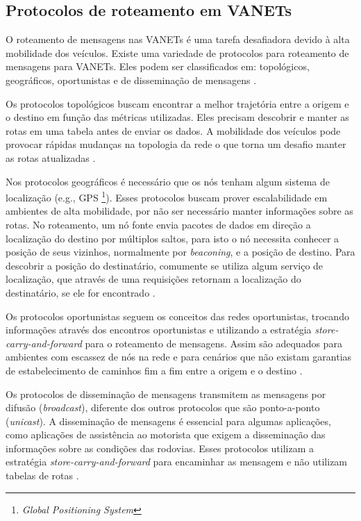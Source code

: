 \documentclass[mestrado, pre-defesa, english, brazil]{packages/icmc}
\begin{document}
\subsection{Protocolos de roteamento em VANETs} \label{algo_rot_vanets}

O roteamento de mensagens nas VANETs é uma tarefa desafiadora devido à alta mobilidade dos veículos.
Existe uma variedade de protocolos para roteamento de mensagens para VANETs. Eles podem ser classificados em: topológicos, geográficos, oportunistas e de disseminação de mensagens .

Os protocolos topológicos buscam encontrar a melhor trajetória entre a origem e o destino em função das métricas utilizadas. Eles precisam descobrir e manter as rotas em uma tabela antes de enviar os dados.  A mobilidade dos veículos pode provocar rápidas mudanças na topologia da rede o que torna um desafio manter as rotas atualizadas \cite{sa-2012}.

Nos protocolos geográficos é necessário que os nós tenham algum sistema de localização (e.g., GPS \footnote{\textit{Global Positioning System}}). Esses protocolos buscam prover escalabilidade em ambientes de alta mobilidade, por não ser necessário manter informações sobre as rotas. No roteamento, um nó fonte envia pacotes de dados em direção a localização do destino por múltiplos saltos, para isto o nó necessita conhecer a posição de seus vizinhos, normalmente por \textit{beaconing}, e a posição de destino. Para descobrir a posição do destinatário, comumente se utiliza algum serviço de localização, que através de uma requisições retornam a localização do destinatário, se ele for encontrado \cite{Alves-2009}.

Os protocolos oportunistas seguem os conceitos das redes oportunistas, trocando informações através dos encontros oportunistas e utilizando a estratégia \textit{store-carry-and-forward} para o roteamento de mensagens. Assim são adequados para ambientes com escassez de nós na rede e para cenários que não existam garantias de estabelecimento de caminhos fim a fim entre a origem e o destino \cite{oliveira-2010}.

Os protocolos de disseminação de mensagens transmitem as mensagens por difusão (\textit{broadcast}), diferente dos outros protocolos que são ponto-a-ponto (\textit{unicast}). A disseminação de mensagens é essencial para algumas aplicações, como aplicações de assistência ao motorista que exigem a disseminação das informações sobre as condições das rodovias. Esses protocolos utilizam a estratégia \textit{store-carry-and-forward} para encaminhar as mensagem e não utilizam tabelas de rotas \cite{Alves-2009}.
\end{document}
